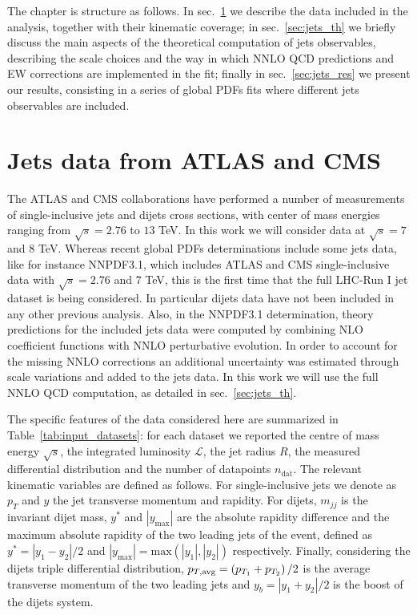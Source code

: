 %
The chapter is structure as follows. In sec.~\ref{sec:jets_data} we describe the data included in the analysis,
together with their kinematic coverage; in sec.~\ref{sec:jets_th} we briefly discuss the main aspects of the theoretical
computation of jets observables, describing the scale choices and the way in which NNLO QCD predictions and EW corrections 
are implemented in the fit; finally in sec.~\ref{sec:jets_res} we present our results, consisting in a series of global
PDFs fits where different jets observables are included.

\section{Jets data from ATLAS and CMS}
\label{sec:jets_data}
The ATLAS and CMS collaborations have performed a number of measurements of single-inclusive jets and 
dijets cross sections, with center of mass energies ranging from $\sqrt{s}=2.76$ to $13$ TeV.
In this work we will consider data at $\sqrt{s}=7$ and $8$ TeV.
%
Whereas recent global PDFs determinations include some jets data, like for instance NNPDF3.1, which includes ATLAS and CMS 
single-inclusive data with $\sqrt{s}=2.76$ and $7$ TeV, this is the first time that the full LHC-Run I jet dataset is being 
considered. In particular dijets data have not been included in any other previous analysis.
Also, in the NNPDF3.1 determination, theory predictions for the included jets data were computed 
by combining NLO coefficient functions with NNLO perturbative evolution. In order to account for the
missing NNLO corrections an additional uncertainty was estimated through scale variations and added to the jets data.
In this work we will use the full NNLO QCD computation, as detailed in sec.~\ref{sec:jets_th}.

%
The specific features of the data considered here are summarized in Table~\ref{tab:input_datasets}:
for each dataset we reported the centre of mass energy $\sqrt{s}$, 
the integrated luminosity $\mathcal{L}$, the jet radius $R$,
the measured differential distribution and the number of datapoints $n_{\text{dat}}$.
The relevant kinematic variables are defined as follows.
For single-inclusive jets we denote as $p_T$ and $y$ the jet transverse momentum and rapidity.
For dijets, $m_{jj}$ is the invariant dijet mass, $y^*$ and $|y_{\text{max}}|$ are the absolute rapidity difference
and the maximum absolute rapidity of the two leading jets of the event, defined as $y^*=|y_1-y_2|/2$
and $|y_{\text{max}}|= \text{max}\left(|y_1|,|y_2|\right)$ respectively.
Finally, considering the dijets triple differential distribution,
$p_{T,\rm avg} = \left(p_{T_1}+p_{T_2}\right)/2$ is the average transverse momentum of the two leading jets and 
$y_b = |y_1+y_2|/2$ is the boost of the dijets system.

